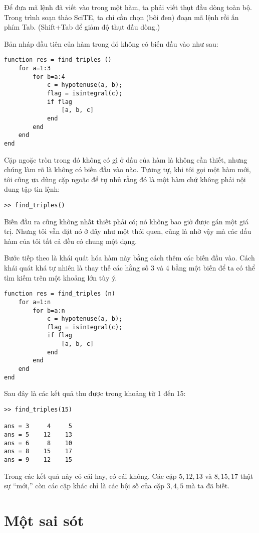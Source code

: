 \documentclass[12pt]{book}
\begin{document}
Để đưa mã lệnh đã viết vào trong một hàm, ta phải viết thụt đầu dòng 
toàn bộ. Trong trình soạn thảo SciTE, ta chỉ cần chọn (bôi đen) đoạn mã lệnh
rồi ấn phím Tab. (Shift+Tab để giảm độ thụt đầu dòng.)

Bản nháp đầu tiên của hàm trong đó không có biến đầu vào như sau:

\begin{verbatim}
function res = find_triples ()
    for a=1:3
        for b=a:4
            c = hypotenuse(a, b);
            flag = isintegral(c);
            if flag
                [a, b, c]
            end
        end
    end
end
\end{verbatim}
%
Cặp ngoặc tròn trong đó không có gì ở dấu của hàm là không cần thiết,
nhưng chúng làm rõ là không có biến đầu vào nào. Tương tự, khi tôi gọi
một hàm mới, tôi cũng ưa dùng cặp ngoặc để tự nhủ rằng đó là một hàm
chứ không phải nội dung tập tin lệnh:

\begin{verbatim}
>> find_triples()
\end{verbatim}
%
Biến đầu ra cũng không nhất thiết phải có; nó không bao giờ được gán
một giá trị. Nhưng tôi vẫn đặt nó ở đây như một thói quen, cũng là
nhờ vậy mà các dấu hàm của tôi tất cả đều có chung một dạng.

Bước tiếp theo là khái quát hóa hàm này bằng cách thêm các biến
đầu vào. Cách khái quát khá tự nhiên là thay thế các hằng số
3 và 4 bằng một biến để ta có thể tìm kiếm trên một khoảng lớn
tùy ý.

\begin{verbatim}
function res = find_triples (n)
    for a=1:n
        for b=a:n
            c = hypotenuse(a, b);
            flag = isintegral(c);
            if flag
                [a, b, c]
            end
        end
    end
end
\end{verbatim}
%
Sau đây là các kết quả thu được trong khoảng từ 1 đến 15:

\begin{verbatim}
>> find_triples(15)

ans = 3     4     5
ans = 5    12    13
ans = 6     8    10
ans = 8    15    17
ans = 9    12    15
\end{verbatim}
%
Trong các kết quả này có cái hay, có cái không. Các cặp 
$5,12,13$ và $8,15,17$ thật sự ``mới,'' còn các cặp khác
chỉ là các bội số của cặp $3,4,5$ mà ta đã biết.


\section{Một sai sót}
\end{document}

